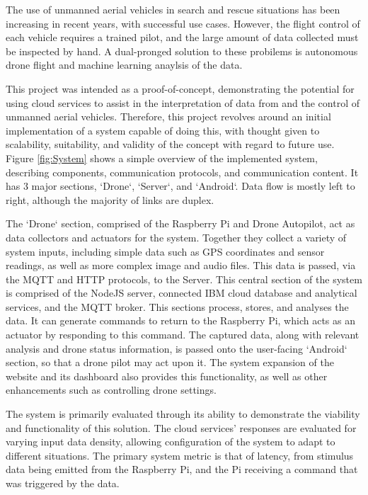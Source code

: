 \documentclass{article}
\begin{document}
The use of unmanned aerial vehicles in search and rescue situations has been increasing in recent years, with successful use cases. However, the flight control of each vehicle requires a trained pilot, and the large amount of data collected must be inspected by hand. A dual-pronged solution to these probilems is autonomous drone flight and machine learning anaylsis of the data.


This project was intended as a proof-of-concept, demonstrating the potential for using cloud services to assist in the interpretation of data from and the control of unmanned aerial vehicles. Therefore, this project revolves around an initial implementation of a system capable of doing this, with thought given to scalability, suitability, and validity of the concept with regard to future use. Figure \ref{fig:System} shows a simple overview of the implemented system, describing components, communication protocols, and communication content. It has 3 major sections, `Drone`, `Server`, and `Android`. Data flow is mostly left to right, although the majority of links are duplex. 

The `Drone` section, comprised of the Raspberry Pi and Drone Autopilot, act as data collectors and actuators for the system. Together they collect a variety of system inputs, including simple data such as GPS coordinates and sensor readings, as well as more complex image and audio files. This data is passed, via the MQTT and HTTP protocols, to the Server. This central section of the system is comprised of the NodeJS server, connected IBM cloud database and analytical services, and the MQTT broker. This sections process, stores, and analyses the data. It can generate commands to return to the Raspberry Pi, which acts as an actuator by responding to this command. The captured data, along with relevant analysis and drone status information, is passed onto the user-facing `Android` section, so that a drone pilot may act upon it. The system expansion of the website and its dashboard also provides this functionality, as well as other enhancements such as controlling drone settings.

The system is primarily evaluated through its ability to demonstrate the viability and functionality of this solution. The cloud services' responses are evaluated for varying input data density, allowing configuration of the system to adapt to different situations. The primary system metric is that of latency, from stimulus data being emitted from the Raspberry Pi, and the Pi receiving a command that was triggered by the data. 
\end{document}
